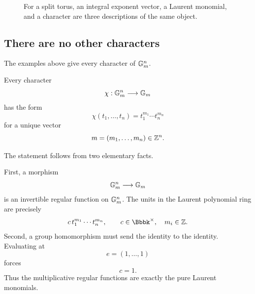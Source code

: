 \begin{figure}[ht]
\centering
{}
\caption{For a split torus, an integral exponent vector, a Laurent
monomial, and a character are three descriptions of the same object.}
\label{fig:exponent-monomial-character}
\end{figure}

\subsection{There are no other characters}

The examples above give every character of \(\mathbb{G}_{m}^n\).

\begin{theorem}
\label{thm:characters-split-torus}
Every character
\[
\chi:\mathbb{G}_{m}^n\longrightarrow\mathbb{G}_{m}
\]
has the form
\[
\chi(t_1,\ldots,t_n)
=
t_1^{m_1}\cdots t_n^{m_n}
\]
for a unique vector
\[
m=(m_1,\ldots,m_n)\in\mathbb{Z}^n.
\]
\end{theorem}

The statement follows from two elementary facts.

First, a morphism
\[
\mathbb{G}_{m}^n\longrightarrow\mathbb{G}_{m}
\]
is an invertible regular function on \(\mathbb{G}_{m}^n\). The units in the
Laurent polynomial ring are precisely
\[
c\,t_1^{m_1}\cdots t_n^{m_n},
\qquad
c\in\Bbbk^\times,\quad m_i\in\ZZ.
\]
Second, a group homomorphism must send the identity to the identity.
Evaluating at
\[
e=(1,\ldots,1)
\]
forces
\[
c=1.
\]
Thus the multiplicative regular functions are exactly the pure Laurent
monomials.

